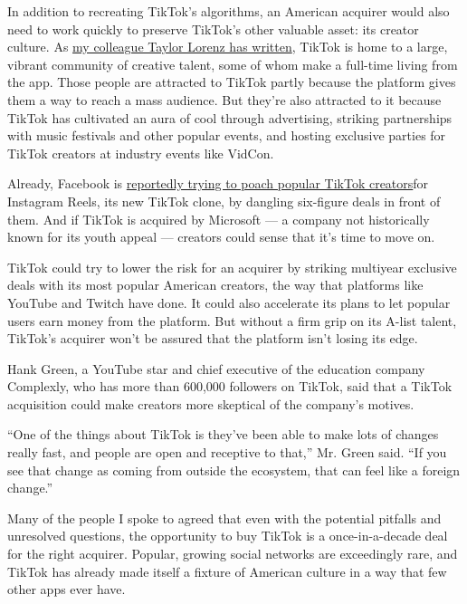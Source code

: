 In addition to recreating TikTok's algorithms, an American acquirer
would also need to work quickly to preserve TikTok's other valuable
asset: its creator culture. As
\href{https://www.nytimes3xbfgragh.onion/2020/08/02/style/tiktok-ban-threat-trump.html}{my
colleague Taylor Lorenz has written}, TikTok is home to a large, vibrant
community of creative talent, some of whom make a full-time living from
the app. Those people are attracted to TikTok partly because the
platform gives them a way to reach a mass audience. But they're also
attracted to it because TikTok has cultivated an aura of cool through
advertising, striking partnerships with music festivals and other
popular events, and hosting exclusive parties for TikTok creators at
industry events like VidCon.

Already, Facebook is
\href{https://www.wsj.com/articles/facebook-seeks-to-reel-in-tiktok-creators-raising-stakes-in-social-media-rivalry-11595928600}{reportedly
trying to poach popular TikTok creators}for Instagram Reels, its new
TikTok clone, by dangling six-figure deals in front of them. And if
TikTok is acquired by Microsoft --- a company not historically known for
its youth appeal --- creators could sense that it's time to move on.

TikTok could try to lower the risk for an acquirer by striking multiyear
exclusive deals with its most popular American creators, the way that
platforms like YouTube and Twitch have done. It could also accelerate
its plans to let popular users earn money from the platform. But without
a firm grip on its A-list talent, TikTok's acquirer won't be assured
that the platform isn't losing its edge.

Hank Green, a YouTube star and chief executive of the education company
Complexly, who has more than 600,000 followers on TikTok, said that a
TikTok acquisition could make creators more skeptical of the company's
motives.

``One of the things about TikTok is they've been able to make lots of
changes really fast, and people are open and receptive to that,'' Mr.
Green said. ``If you see that change as coming from outside the
ecosystem, that can feel like a foreign change.''

Many of the people I spoke to agreed that even with the potential
pitfalls and unresolved questions, the opportunity to buy TikTok is a
once-in-a-decade deal for the right acquirer. Popular, growing social
networks are exceedingly rare, and TikTok has already made itself a
fixture of American culture in a way that few other apps ever have.

